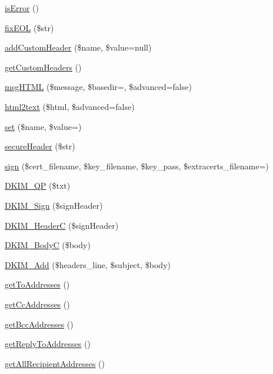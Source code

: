 \begin{DoxyCompactItemize}
\mbox{\hyperlink{class_p_h_p_mailer_ae781c666caa03737687dd67232824582}{is\+Error}} ()
\item 
\mbox{\hyperlink{class_p_h_p_mailer_a3b4fad02d1b8ed3aaefbff42bf0b2846}{fix\+E\+OL}} (\$str)
\item 
\mbox{\hyperlink{class_p_h_p_mailer_a12be8fba58266eb85f2dbac5faba442d}{add\+Custom\+Header}} (\$name, \$value=null)
\item 
\mbox{\hyperlink{class_p_h_p_mailer_aa685d75b52b7ced5ddb1c3bfcc482b99}{get\+Custom\+Headers}} ()
\item 
\mbox{\hyperlink{class_p_h_p_mailer_a78c3d1937d0fa804cc38d005f174cb32}{msg\+H\+T\+ML}} (\$message, \$basedir=\textquotesingle{}\textquotesingle{}, \$advanced=false)
\item 
\mbox{\hyperlink{class_p_h_p_mailer_a7d0b7d428d537916c31cd42301709e20}{html2text}} (\$html, \$advanced=false)
\item 
\mbox{\hyperlink{class_p_h_p_mailer_a71faad700fa71876e41d1118daf45a89}{set}} (\$name, \$value=\textquotesingle{}\textquotesingle{})
\item 
\mbox{\hyperlink{class_p_h_p_mailer_aa2bef564ca933ff831f2985b7fc87298}{secure\+Header}} (\$str)
\item 
\mbox{\hyperlink{class_p_h_p_mailer_a90f8cfae744497250bcef6b40b8b1e6b}{sign}} (\$cert\+\_\+filename, \$key\+\_\+filename, \$key\+\_\+pass, \$extracerts\+\_\+filename=\textquotesingle{}\textquotesingle{})
\item 
\mbox{\hyperlink{class_p_h_p_mailer_aa3359069634a324db4db430e2a5236d3}{D\+K\+I\+M\+\_\+\+QP}} (\$txt)
\item 
\mbox{\hyperlink{class_p_h_p_mailer_a1a20762f9d24610dbc042df09a161564}{D\+K\+I\+M\+\_\+\+Sign}} (\$sign\+Header)
\item 
\mbox{\hyperlink{class_p_h_p_mailer_a1e62388dd7fe1e63baf24a219a860e7a}{D\+K\+I\+M\+\_\+\+HeaderC}} (\$sign\+Header)
\item 
\mbox{\hyperlink{class_p_h_p_mailer_aa9663f6262eef13ea3f6c75d142460a7}{D\+K\+I\+M\+\_\+\+BodyC}} (\$body)
\item 
\mbox{\hyperlink{class_p_h_p_mailer_a5d557c422dd418a81147aeadf65a21d2}{D\+K\+I\+M\+\_\+\+Add}} (\$headers\+\_\+line, \$subject, \$body)
\item 
\mbox{\hyperlink{class_p_h_p_mailer_af22f192632b6f6d8c48115dc9ee87953}{get\+To\+Addresses}} ()
\item 
\mbox{\hyperlink{class_p_h_p_mailer_a2425fbefa7ffa627e4a1a4d3d2856cdb}{get\+Cc\+Addresses}} ()
\item 
\mbox{\hyperlink{class_p_h_p_mailer_a0a10fbbc813dfe528772bbb1a9240409}{get\+Bcc\+Addresses}} ()
\item 
\mbox{\hyperlink{class_p_h_p_mailer_a158031d49131fcfa354986010796a967}{get\+Reply\+To\+Addresses}} ()
\item 
\mbox{\hyperlink{class_p_h_p_mailer_a32cd11f072a716c6e03be18e91882a3e}{get\+All\+Recipient\+Addresses}} ()
\end{DoxyCompactItemize}
